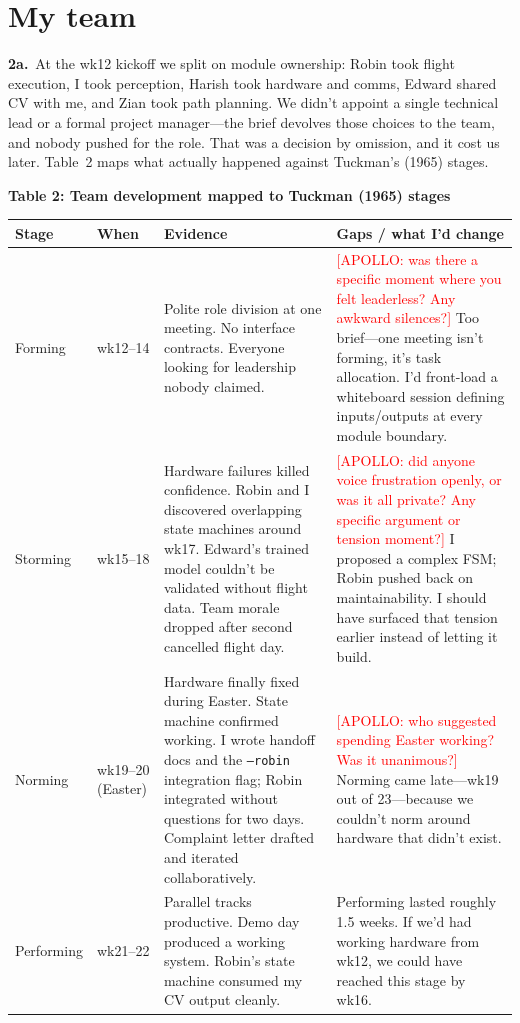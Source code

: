 \section{My team}

\textbf{2a.}~At the wk12 kickoff we split on module ownership: Robin took flight execution, I took perception, Harish took hardware and comms, Edward shared CV with me, and Zian took path planning. We didn't appoint a single technical lead or a formal project manager---the brief devolves those choices to the team, and nobody pushed for the role. That was a decision by omission, and it cost us later. Table~2 maps what actually happened against Tuckman's (1965) stages.

\vspace{0.3em}
{\small
\noindent\textbf{Table 2: Team development mapped to Tuckman (1965) stages}

\begin{tabularx}{\textwidth}{@{}l l L L@{}}
\toprule
\textbf{Stage} & \textbf{When} & \textbf{Evidence} & \textbf{Gaps / what I'd change} \\
\midrule
Forming & wk12--14 & Polite role division at one meeting. No interface contracts. Everyone looking for leadership nobody claimed. & \textcolor{red}{[APOLLO: was there a specific moment where you felt leaderless? Any awkward silences?]} Too brief---one meeting isn't forming, it's task allocation. I'd front-load a whiteboard session defining inputs/outputs at every module boundary. \\
Storming & wk15--18 & Hardware failures killed confidence. Robin and I discovered overlapping state machines around wk17. Edward's trained model couldn't be validated without flight data. Team morale dropped after second cancelled flight day. & \textcolor{red}{[APOLLO: did anyone voice frustration openly, or was it all private? Any specific argument or tension moment?]} I proposed a complex FSM; Robin pushed back on maintainability. I should have surfaced that tension earlier instead of letting it build. \\
Norming & wk19--20 (Easter) & Hardware finally fixed during Easter. State machine confirmed working. I wrote handoff docs and the \texttt{--robin} integration flag; Robin integrated without questions for two days. Complaint letter drafted and iterated collaboratively. & \textcolor{red}{[APOLLO: who suggested spending Easter working? Was it unanimous?]} Norming came late---wk19 out of 23---because we couldn't norm around hardware that didn't exist. \\
Performing & wk21--22 & Parallel tracks productive. Demo day produced a working system. Robin's state machine consumed my CV output cleanly. & Performing lasted roughly 1.5 weeks. If we'd had working hardware from wk12, we could have reached this stage by wk16. \\
\bottomrule
\end{tabularx}
}
\vspace{0.3em}

